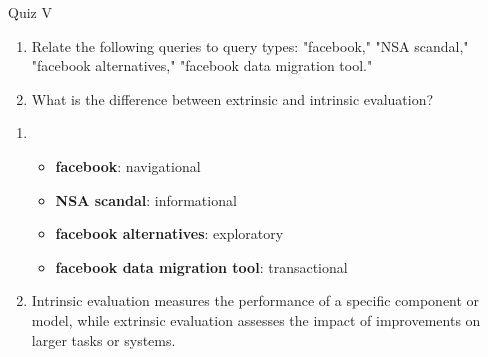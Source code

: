 \documentclass{article}
\begin{document}
\begin{exercise}{Quiz V}
  \begin{enumerate}
    \item Relate the following queries to query types: "facebook," "NSA scandal," "facebook alternatives," "facebook data migration tool."
    \item What is the difference between extrinsic and intrinsic evaluation?
  \end{enumerate}

  \begin{solution}
    \begin{enumerate}
      \item \begin{itemize}
          \item \textbf{facebook}: navigational
          \item \textbf{NSA scandal}: informational
          \item \textbf{facebook alternatives}: exploratory
          \item \textbf{facebook data migration tool}: transactional
        \end{itemize}
      \item Intrinsic evaluation measures the performance of a specific component or model, while extrinsic evaluation assesses the impact of improvements on larger tasks or systems.
    \end{enumerate}
  \end{solution}
\end{exercise}
\end{document}
